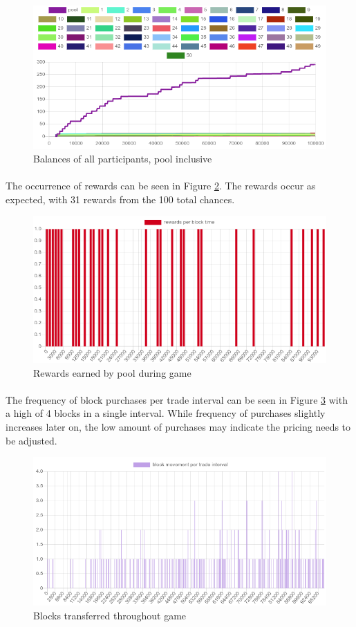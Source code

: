 \begin{figure}[H]
  \centering
  \caption{Balances of all participants, pool inclusive}
  \label{figure:balances-pool}
  \includegraphics[width=\linewidth]{media/fig-balances-pool}
\end{figure}

\paragraph{} The occurrence of rewards can be seen in Figure \ref{figure:rewards}. The rewards occur as expected, with 31 rewards from the 100 total chances.

\begin{figure}[H]
  \centering
  \caption{Rewards earned by pool during game}
  \label{figure:rewards}
  \includegraphics[width=\linewidth]{media/fig-rewards}
\end{figure}

\paragraph{} The frequency of block purchases per trade interval can be seen in Figure \ref{figure:blocks} with a high of 4 blocks in a single interval. While frequency of purchases slightly increases later on, the low amount of purchases may indicate the pricing needs to be adjusted.

\begin{figure}[H]
  \centering
  \caption{Blocks transferred throughout game}
  \label{figure:blocks}
  \includegraphics[width=\linewidth]{media/fig-blocks}
\end{figure}